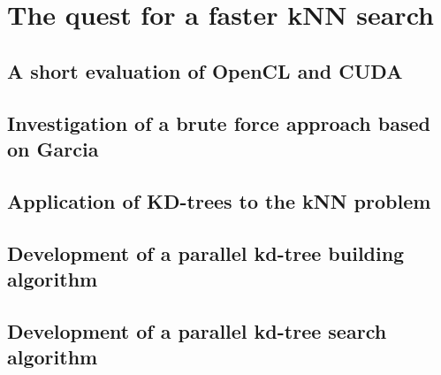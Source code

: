 
\section{The quest for a faster kNN search} %
\label{sec:the_quest_for_a_faster_knn_search}

\subsection{A short evaluation of OpenCL and CUDA} %
\label{sub:a_short_evaluation_of_opencl_and_cuda}


\subsection{Investigation of a brute force approach based on Garcia} %
\label{sub:investigation_of_a_brute_force_approach_based_on_garcia}


\subsection{Application of KD-trees to the kNN problem} %
\label{sub:application_of_kd_trees_to_the_knn_problem}


\subsection{Development of a parallel kd-tree building algorithm} %
\label{sub:development_of_a_parallel_kd_tree_building_algorithm}


\subsection{Development of a parallel kd-tree search algorithm} %
\label{sub:development_of_a_parallel_kd_tree_search_algorithm}
